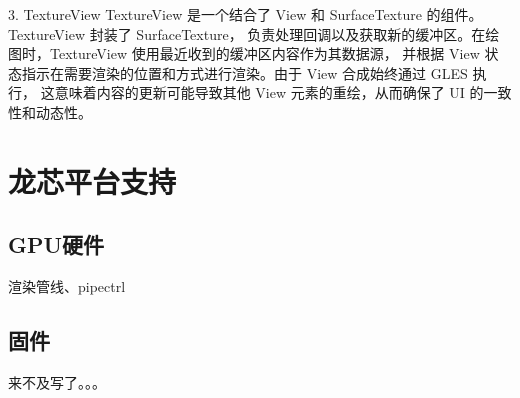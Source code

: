 3. TextureView
TextureView 是一个结合了 View 和 SurfaceTexture 的组件。TextureView 封装了 SurfaceTexture，
负责处理回调以及获取新的缓冲区。在绘图时，TextureView 使用最近收到的缓冲区内容作为其数据源，
并根据 View 状态指示在需要渲染的位置和方式进行渲染。由于 View 合成始终通过 GLES 执行，
这意味着内容的更新可能导致其他 View 元素的重绘，从而确保了 UI 的一致性和动态性。


\section{龙芯平台支持}
\subsection{GPU硬件}
渲染管线、pipectrl
\subsection{固件}
来不及写了。。。

